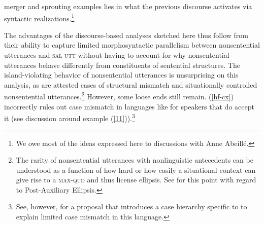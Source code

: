 merger and sprouting examples lies in what the previous discourse
activates via syntactic realizations.\footnote{We owe most of the ideas expressed here to discussions
with Anne Abeill\'{e}.}
%
%
%
%
%
%
%

The advantages of the discourse-based analyses sketched here thus follow from their ability to capture limited morphosyntactic parallelism between nonsentential utterances and \textsc{sal-utt} without having to account for why nonsentential utterances behave differently from constituents of sentential structures. The island-violating behavior of nonsentential utterances is unsurprising on this analysis, as are attested cases of structural mismatch and situationally controlled nonsentential utterances.\footnote{The rarity of nonsentential utterances with nonlinguistic antecedents can be understood as a function of how hard or how easily a situational context can give rise to a \textsc{max-qud} and thus license ellipsis. See \citet{Miller2014b} for this point with regard to Post-Auxiliary Ellipsis.}
However, some loose ends still remain. (\ref{hf-cx}) %
incorrectly rules out case mismatch in languages like  for speakers that do accept it (see discussion around example (\ref{11})).\footnote{See, however, \citet{Kim2015} for a proposal that introduces a case hierarchy specific to  to explain limited case mismatch in this language.}



